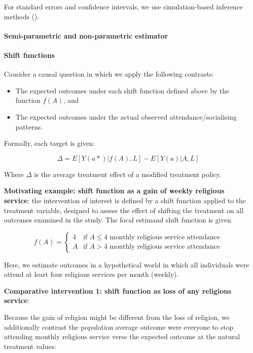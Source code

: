 \documentclass[
  singlecolumn]{article}
\let\oldparagraph\paragraph
\renewcommand{\paragraph}[1]{\oldparagraph{#1}\mbox{}}
\providecommand{\tightlist}{%
  \setlength{\itemsep}{0pt}\setlength{\parskip}{0pt}}\usepackage{longtable,booktabs,array}
\begin{document}
For standard errors and confidence intervals, we use simulation-based
inference methods ().

\paragraph{Semi-parametric and non-parametric
estimator}\label{semi-parametric-and-non-parametric-estimator}

\paragraph{Shift functions}\label{shift-functions}

Causider a causal question in which we apply the following contrasts:

\begin{itemize}
\tightlist
\item
  The expected outcomes under each shift function defined above by the
  function \(f(A)\), and
\item
  The expected outcomes under the actual observed attendance/socialising
  patterns.
\end{itemize}

Formally, each target is given:

\[ \Delta = E[Y(a*)|f(A),L] - E[Y(a)|A,L] \]

Where \(\Delta\) is the average treatment effect of a modified treatment
policy.

\textbf{Motivating example: shift function as a gain of weekly religious
service}: the intervention of interest is defined by a shift function
applied to the treatment variable, designed to assess the effect of
shifting the treatment on all outcomes examined in the study. The focal
estimand shift function is given

\[f(A) = \begin{cases} 4 & \text{if } A \leq 4  \text{ monthly religious service attendance} \\ A & \text{if } A > 4  \text{ monthly religious service attendance} \end{cases} \]

Here, we estimate outcomes in a hypothetical world in which all
individuals were attend at least four religious services per month
(weekly).

\textbf{Comparative intervention 1: shift function as loss of any
religious service}:

Because the gain of religion might be different from the loss of
religion, we additionally contrast the population average outcome were
everyone to stop attending monthly religious service verse the expected
outcome at the natural treatment values:
\end{document}
